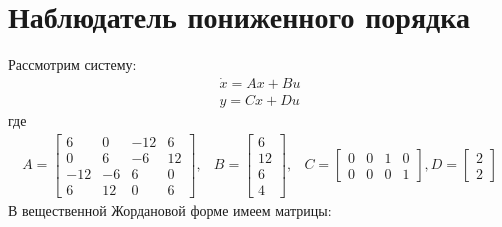 \section{Наблюдатель пониженного порядка}
Рассмотрим систему:
\begin{equation}
    \begin{array}{ll}
        \dot{x} = Ax + Bu\\
        y = Cx + Du
    \end{array}
\end{equation}
где
\begin{equation}
    \begin{array}{cccc}
        A = \begin{bmatrix}
            6 & 0 & -12 & 6 \\ 
            0 & 6 & -6 & 12 \\
            -12 & -6 & 6 & 0 \\
            6 & 12 & 0 & 6
        \end{bmatrix}, & 
        B = \begin{bmatrix}
            6 \\ 12 \\ 6 \\ 4
        \end{bmatrix}, & 
        C = \begin{bmatrix}
            0 & 0 & 1 & 0 \\ 
            0 & 0 & 0 & 1
        \end{bmatrix}, 
        D = \begin{bmatrix}
            2 \\ 2
        \end{bmatrix}
    \end{array}
\end{equation}
В вещественной Жордановой форме имеем матрицы:
